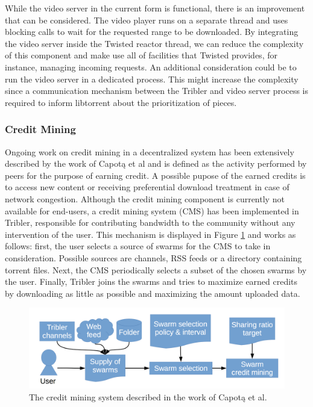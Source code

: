 While the video server in the current form is functional, there is an improvement that can be considered. The video player runs on a separate thread and uses blocking calls to wait for the requested range to be downloaded. By integrating the video server inside the Twisted reactor thread, we can reduce the complexity of this component and make use all of facilities that Twisted provides, for instance, managing incoming requests. An additional consideration could be to run the video server in a dedicated process. This might increase the complexity since a communication mechanism between the Tribler and video server process is required to inform libtorrent about the prioritization of pieces.

\subsubsection{\textbf{Credit Mining}}
Ongoing work on credit mining in a decentralized system has been extensively described by the work of Capot\k{a} et al\cite{capotka2015decentralized} and is defined as the activity performed by peers for the purpose of earning credit. A possible pupose of the earned  credits is to access new content or receiving preferential download treatment in case of network congestion. Although the credit mining component is currently not available for end-users, a credit mining system (CMS) has been implemented in Tribler, responsible for contributing bandwidth to the community without any intervention of the user. This mechanism is displayed in Figure \ref{fig:credit-mining} and works as follows: first, the user selects a source of swarms for the CMS to take in consideration. Possible sources are channels, RSS feeds or a directory containing torrent files. Next, the CMS periodically selects a subset of the chosen swarms by the user. Finally, Tribler joins the swarms and tries to maximize earned credits by downloading as little as possible and maximizing the amount uploaded data.\\

\begin{figure}[h!]
	\centering
	\includegraphics[width=0.7\columnwidth]{images/architecture/credit_mining}
	\caption{The credit mining system described in the work of Capot\k{a} et al.\cite{capotka2015decentralized}}
	\label{fig:credit-mining}
\end{figure}

